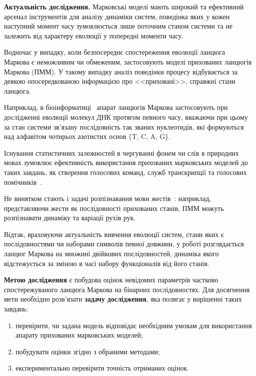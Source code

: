 \textbf{Актуальність дослідження.} Марковські моделі мають широкий та ефективний арсенал інструментів для аналізу динаміки систем, поведінка яких у кожен наступний момент часу зумовлюється лише поточним станом системи та не залежить від характеру еволюції у попередні моменти часу. 

Водночас у випадку, коли безпосереднє спостереження еволюції ланцюга Маркова є неможливим чи обмеженим, застосовують моделі прихованих ланцюгів Маркова (ПММ). У такому випадку аналіз поведінки процесу відбувається за деякою опосередкованою інформацією про <<приховані>>, справжні стани ланцюга. 

Наприклад, в біоінформатиці~\cite[глава 9]{Koski2001} апарат ланцюгів Маркова застосовують при дослідженні еволюції молекул ДНК протягом певного часу, вважаючи при цьому за стан системи зв'язану послідовність так званих нуклеотидів, які формуються над алфавітом чотирьох азотистих основ $\{\text{T, C, A, G} \}$.  

Існування статистичних залежностей в чергуванні фонем чи слів в природних мовах зумовлює ефективність використання прихованих марковських моделей до таких завдань, як створення голосових команд, служб транскрипції та голосових помічників~\cite{Rabiner1989}.

Не винятком стають і задачі розпізнавання мови жестів~\cite{Chaaraoui2013}: наприклад, представляючи жести як послідовності прихованих станів, ПММ можуть розпізнавати динаміку та варіації рухів рук.

Відтак, враховуючи актуальність вивчення еволюції систем, стани яких є послідовностями чи наборами символів певної довжини, у роботі розглядається ланцюг Маркова на множині двійкових послідовностей, динаміка якого відстежується за зміною в часі набору функціоналів від його станів.

\textbf{Метою дослідження} є побудова оцінок невідомих параметрів частково спостережуваного ланцюга Маркова на бінарних послідовностях. Для досягнення мети необхідно розв'язати \textbf{задачу дослідження}, яка полягає у вирішенні таких завдань:

\begin{enumerate}
\item перевірити, чи задана модель відповідає необхідним умовам для використання апарату прихованих марковських моделей;
\item побудувати оцінки згідно з обраними методами;
\item експериментально перевірити точність отриманих оцінок.
\end{enumerate}

